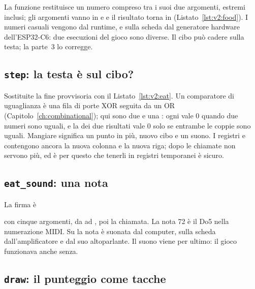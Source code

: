 
La funzione  restituisce un numero
compreso tra i suoi due argomenti, estremi inclusi; gli argomenti vanno in
 e  e il risultato torna in 
(Listato~\ref{lst:v2:food}). I numeri casuali vengono dal runtime, e sulla
scheda dal generatore hardware dell'ESP32-C6: due esecuzioni del gioco sono
diverse. Il cibo può cadere sulla testa; la parte~3 lo corregge.

\subsection{\texttt{step}: la testa è sul cibo?}


Sostituite la fine provvisoria con il Listato~\ref{lst:v2:eat}. Un comparatore
di uguaglianza è una fila di porte XOR seguita da un OR
(Capitolo~\ref{ch:combinational}); qui sono due  e una : ogni
 vale 0 quando due numeri sono uguali, e la  dei due risultati
vale 0 solo se entrambe le coppie sono uguali. Mangiare significa un punto in
più, nuovo cibo e un suono. I registri  e  contengono ancora la
nuova colonna e la nuova riga; dopo le chiamate non servono più, ed è per
questo che tenerli in registri temporanei è sicuro.

\subsection{\texttt{eat\_sound}: una nota}


La firma è
\begin{center}\end{center}
con cinque argomenti, da  ad , poi la chiamata. La nota 72 è il
Do5 nella numerazione MIDI. Su \prgqt la nota è suonata dal computer, sulla
scheda dall'amplificatore e dal suo altoparlante. Il suono viene per ultimo: il
gioco funzionava anche senza.

\subsection{\texttt{draw}: il punteggio come tacche}

